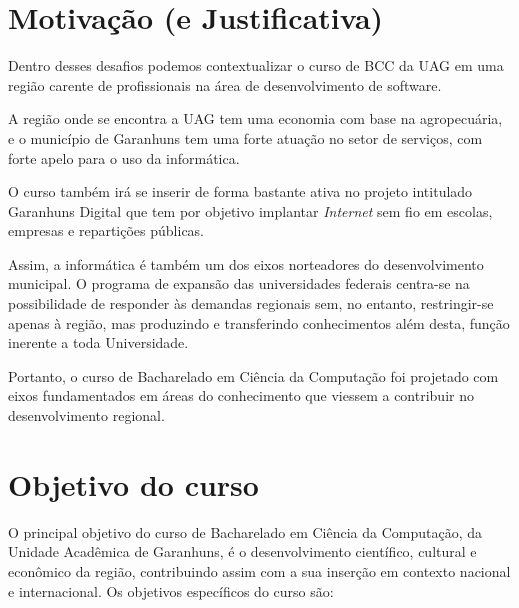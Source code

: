 \documentclass[
	12pt,				%
	openright,			%
  oneside,     %
	a4paper,			%
	english,			%
	french,				%
	spanish,			%
	brazil				%
	]{abntex2}
\begin{document}
\section*{Motivação (e Justificativa)}

Dentro desses desafios podemos contextualizar o curso de BCC da UAG em uma
região carente de profissionais na área de desenvolvimento de software.

A região onde se encontra a UAG tem uma economia com base na agropecuária, e o
município de Garanhuns tem uma forte atuação no setor de serviços, com forte
apelo para o uso da informática. 

O curso também irá se inserir de forma bastante  ativa no projeto intitulado
Garanhuns Digital que tem por objetivo implantar  \textit{Internet} sem fio em
escolas, empresas e repartições públicas. 

Assim, a informática  é também um dos eixos norteadores do desenvolvimento
municipal.  O programa de expansão das universidades federais centra-se na
possibilidade de  responder às demandas regionais sem, no entanto,
restringir-se apenas à região,  mas produzindo e  transferindo conhecimentos
além desta, função inerente a toda Universidade.

Portanto, o curso de Bacharelado em Ciência da Computação foi projetado com
eixos fundamentados em áreas do conhecimento que viessem a contribuir no
desenvolvimento regional.

\section*{Objetivo do curso}

O principal objetivo do curso de Bacharelado em Ciência da Computação, da
Unidade Acadêmica de Garanhuns, é o desenvolvimento científico, cultural e
econômico da região, contribuindo assim com a sua inserção em
contexto nacional e internacional. Os objetivos específicos do curso são:
\end{document}
